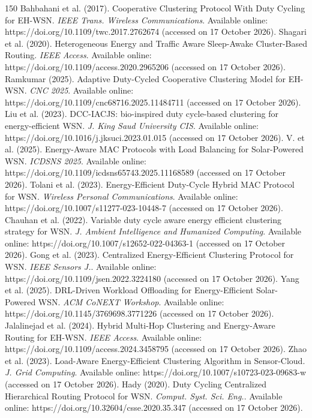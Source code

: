 \begin{thebibliography}{150}
Bahbahani et al. (2017). Cooperative Clustering Protocol With Duty Cycling for EH-WSN. \textit{IEEE Trans. Wireless Communications}. Available online: https://doi.org/10.1109/twc.2017.2762674 (accessed on 17 October 2026).
Shagari et al. (2020). Heterogeneous Energy and Traffic Aware Sleep-Awake Cluster-Based Routing. \textit{IEEE Access}. Available online: https://doi.org/10.1109/access.2020.2965206 (accessed on 17 October 2026).
Ramkumar (2025). Adaptive Duty-Cycled Cooperative Clustering Model for EH-WSN. \textit{CNC 2025}. Available online: https://doi.org/10.1109/cnc68716.2025.11484711 (accessed on 17 October 2026).
Liu et al. (2023). DCC-IACJS: bio-inspired duty cycle-based clustering for energy-efficient WSN. \textit{J. King Saud University CIS}. Available online: https://doi.org/10.1016/j.jksuci.2023.01.015 (accessed on 17 October 2026).
V. et al. (2025). Energy-Aware MAC Protocols with Load Balancing for Solar-Powered WSN. \textit{ICDSNS 2025}. Available online: https://doi.org/10.1109/icdsns65743.2025.11168589 (accessed on 17 October 2026).
Tolani et al. (2023). Energy-Efficient Duty-Cycle Hybrid MAC Protocol for WSN. \textit{Wireless Personal Communications}. Available online: https://doi.org/10.1007/s11277-023-10448-7 (accessed on 17 October 2026).
Chauhan et al. (2022). Variable duty cycle aware energy efficient clustering strategy for WSN. \textit{J. Ambient Intelligence and Humanized Computing}. Available online: https://doi.org/10.1007/s12652-022-04363-1 (accessed on 17 October 2026).
Gong et al. (2023). Centralized Energy-Efficient Clustering Protocol for WSN. \textit{IEEE Sensors J.}. Available online: https://doi.org/10.1109/jsen.2022.3224180 (accessed on 17 October 2026).
Yang et al. (2025). DRL-Driven Workload Offloading for Energy-Efficient Solar-Powered WSN. \textit{ACM CoNEXT Workshop}. Available online: https://doi.org/10.1145/3769698.3771226 (accessed on 17 October 2026).
Jalalinejad et al. (2024). Hybrid Multi-Hop Clustering and Energy-Aware Routing for EH-WSN. \textit{IEEE Access}. Available online: https://doi.org/10.1109/access.2024.3458795 (accessed on 17 October 2026).
Zhao et al. (2023). Load-Aware Energy-Efficient Clustering Algorithm in Sensor-Cloud. \textit{J. Grid Computing}. Available online: https://doi.org/10.1007/s10723-023-09683-w (accessed on 17 October 2026).
Hady (2020). Duty Cycling Centralized Hierarchical Routing Protocol for WSN. \textit{Comput. Syst. Sci. Eng.}. Available online: https://doi.org/10.32604/csse.2020.35.347 (accessed on 17 October 2026).

\end{thebibliography}
